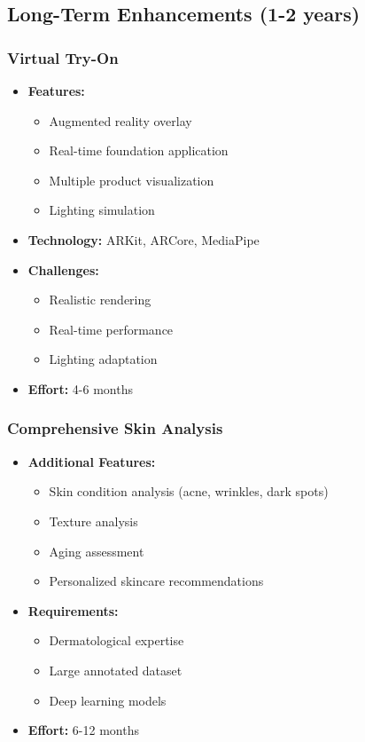 \subsection{Long-Term Enhancements (1-2 years)}

\subsubsection{Virtual Try-On}

\begin{itemize}
    \item \textbf{Features:}
    \begin{itemize}
        \item Augmented reality overlay
        \item Real-time foundation application
        \item Multiple product visualization
        \item Lighting simulation
    \end{itemize}
    \item \textbf{Technology:} ARKit, ARCore, MediaPipe
    \item \textbf{Challenges:}
    \begin{itemize}
        \item Realistic rendering
        \item Real-time performance
        \item Lighting adaptation
    \end{itemize}
    \item \textbf{Effort:} 4-6 months
\end{itemize}

\subsubsection{Comprehensive Skin Analysis}

\begin{itemize}
    \item \textbf{Additional Features:}
    \begin{itemize}
        \item Skin condition analysis (acne, wrinkles, dark spots)
        \item Texture analysis
        \item Aging assessment
        \item Personalized skincare recommendations
    \end{itemize}
    \item \textbf{Requirements:}
    \begin{itemize}
        \item Dermatological expertise
        \item Large annotated dataset
        \item Deep learning models
    \end{itemize}
    \item \textbf{Effort:} 6-12 months
\end{itemize}

